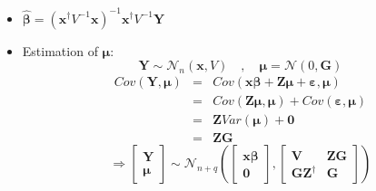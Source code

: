 \documentclass{article}
\begin{document}
\bigskip

\begin{itemize}
\item $\mathbf{\hat{\beta}}=\left( \mathbf{x}^{\dagger }V^{-1}\mathbf{x}%
\right) ^{-1}\mathbf{x}^{\dagger }V^{-1}\mathbf{Y}$

\item Estimation of $\mathbf{\mu }$:%
\begin{equation*}
\mathbf{Y}\sim \mathcal{N}_{n}\left( \mathbf{x},V\right) \quad ,\quad 
\mathbf{\mu }=\mathcal{N}\left( 0,\mathbf{G}\right)
\end{equation*}%
\begin{eqnarray*}
Cov\left( \mathbf{Y,\mu }\right) &=&Cov\left( \mathbf{x\beta }+\mathbf{Z\mu }%
+\mathbf{\varepsilon ,\mu }\right) \\
&=&Cov\left( \mathbf{Z\mu ,\mu }\right) +Cov\left( \mathbf{\varepsilon ,\mu }%
\right) \\
&=&\mathbf{Z}Var\left( \mathbf{\mu }\right) +\mathbf{0} \\
&=&\mathbf{ZG}
\end{eqnarray*}%
\begin{equation*}
\Rightarrow \left[ 
\begin{array}{c}
\mathbf{Y} \\ 
\mathbf{\mu }%
\end{array}%
\right] \sim \mathcal{N}_{n+q}\left( \left[ 
\begin{array}{c}
\mathbf{x\beta } \\ 
\boldsymbol{0}%
\end{array}%
\right] ,\left[ 
\begin{array}{cc}
\mathbf{V} & \mathbf{ZG} \\ 
\mathbf{GZ}^{\dagger } & \mathbf{G}%
\end{array}%
\right] \right)
\end{equation*}
\end{itemize}

\bigskip
\end{document}
